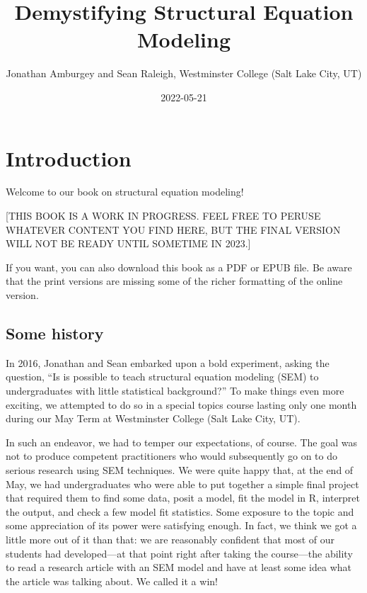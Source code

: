 \documentclass[
]{book}
\title{Demystifying Structural Equation Modeling}
\author{Jonathan Amburgey and Sean Raleigh, Westminster College (Salt Lake City, UT)}
\date{2022-05-21}
\begin{document}
\maketitle

{
\setcounter{tocdepth}{1}
\tableofcontents
}
\hypertarget{intro}{%
\chapter*{Introduction}\label{intro}}

Welcome to our book on structural equation modeling!

{[}THIS BOOK IS A WORK IN PROGRESS. FEEL FREE TO PERUSE WHATEVER CONTENT YOU FIND HERE, BUT THE FINAL VERSION WILL NOT BE READY UNTIL SOMETIME IN 2023.{]}

If you want, you can also download this book as a PDF or EPUB file. Be aware that the print versions are missing some of the richer formatting of the online version.

\hypertarget{intro-history}{%
\section*{Some history}\label{intro-history}}

In 2016, Jonathan and Sean embarked upon a bold experiment, asking the question, ``Is is possible to teach structural equation modeling (SEM) to undergraduates with little statistical background?'' To make things even more exciting, we attempted to do so in a special topics course lasting only one month during our May Term at Westminster College (Salt Lake City, UT).

In such an endeavor, we had to temper our expectations, of course. The goal was not to produce competent practitioners who would subsequently go on to do serious research using SEM techniques. We were quite happy that, at the end of May, we had undergraduates who were able to put together a simple final project that required them to find some data, posit a model, fit the model in R, interpret the output, and check a few model fit statistics. Some exposure to the topic and some appreciation of its power were satisfying enough. In fact, we think we got a little more out of it than that: we are reasonably confident that most of our students had developed---at that point right after taking the course---the ability to read a research article with an SEM model and have at least some idea what the article was talking about. We called it a win!
\end{document}
